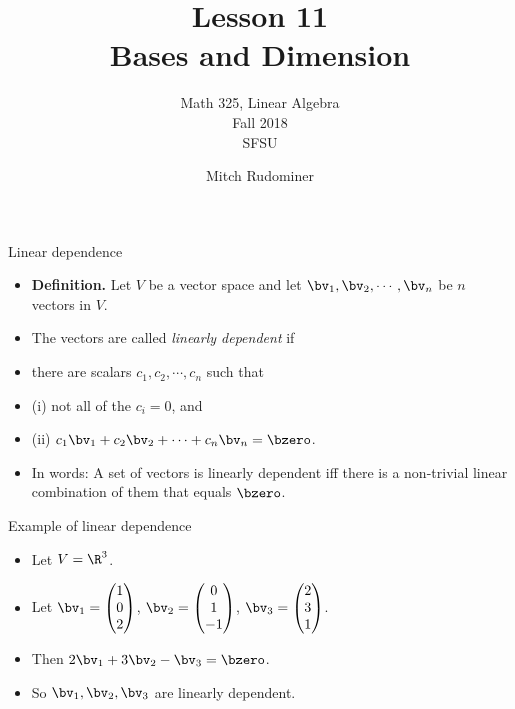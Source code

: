 \documentclass{beamer}
\title{Lesson 11 \\ Bases and Dimension}
\subtitle{Math 325, Linear Algebra \\ Fall 2018 \\ SFSU}
\author{Mitch Rudominer}
\date{}
\begin{document}
\begin{frame}
  \titlepage
\end{frame}

\begin{frame}{Linear dependence}

\begin{itemize}
\item \textbf{Definition.} Let $V$ be a vector space and let $\bv_1,\bv_2,\cdots,\bv_n$ be $n$ vectors in $V$.
\item The vectors are called \emph{linearly dependent} if
\item there are scalars $c_1,c_2,\cdots,c_n$ such that
\item (i) not all of the $c_i = 0$, and
\item (ii) $c_1 \bv_1 + c_2 \bv_2 + \cdots + c_n\bv_n = \bzero$.
\item In words: A set of vectors is linearly dependent iff there is a non-trivial linear combination
of them that equals $\bzero$.
\end{itemize}

\end{frame}

\begin{frame}{Example of linear dependence}

\begin{itemize}
\item Let $V = \R^3$.
\item Let $\bv_1 =
\begin{pmatrix}
1 \\ 0 \\ 2
\end{pmatrix}
$,
$\bv_2 =
\begin{pmatrix}
0 \\ 1 \\ -1
\end{pmatrix}
$,
$\bv_3 =
\begin{pmatrix}
2 \\ 3 \\ 1
\end{pmatrix}
$.

\item Then $2\bv_1+3\bv_2 - \bv_3 = \bzero$.
\item So $\bv_1, \bv_2, \bv_3$ are linearly dependent.
\end{itemize}

\end{frame}
\end{document}

